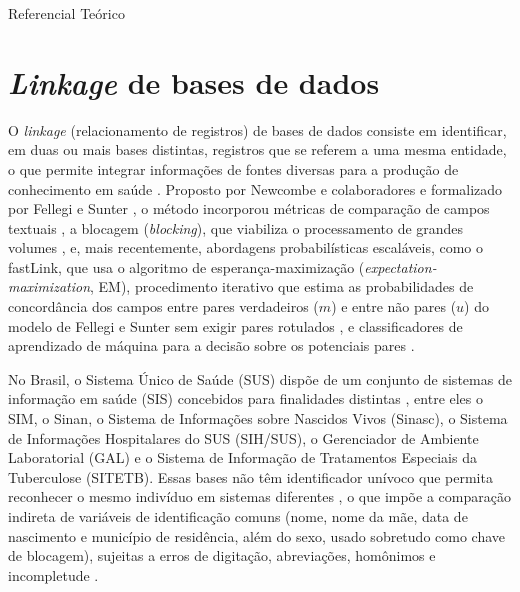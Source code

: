 \begin{chapter}{Referencial Teórico}\label{cap:referencial}

\section{\textit{Linkage} de bases de dados}\label{sec:linkage-conceitos}

O \textit{linkage} (relacionamento de registros) de bases de dados consiste em identificar, em duas ou mais bases distintas, registros que se referem a uma mesma entidade, o que permite integrar informações de fontes diversas para a produção de conhecimento em saúde \cite{Christen2012book}. Proposto por Newcombe e colaboradores \citeyearpar{Newcombe1959automatic} e formalizado por Fellegi e Sunter \citeyearpar{Fellegi1969theory}, o método incorporou métricas de comparação de campos textuais \cite{Jaro1989advances, Winkler1990string}, a blocagem (\textit{blocking}), que viabiliza o processamento de grandes volumes \cite{Coeli2002blocking}, e, mais recentemente, abordagens probabilísticas escaláveis, como o fastLink, que usa o algoritmo de esperança-maximização (\textit{expectation-maximization}, EM), procedimento iterativo que estima as probabilidades de concordância dos campos entre pares verdadeiros ($m$) e entre não pares ($u$) do modelo de Fellegi e Sunter sem exigir pares rotulados \cite{Enamorado2019fastlink}, e classificadores de aprendizado de máquina para a decisão sobre os potenciais pares \cite{Christen2012book}.

No Brasil, o Sistema Único de Saúde (SUS) dispõe de um conjunto de sistemas de informação em saúde (SIS) concebidos para finalidades distintas \cite{Paim2011brazilian}, entre eles o SIM, o Sinan, o Sistema de Informações sobre Nascidos Vivos (Sinasc), o Sistema de Informações Hospitalares do SUS (SIH/SUS), o Gerenciador de Ambiente Laboratorial (GAL) e o Sistema de Informação de Tratamentos Especiais da Tuberculose (SITETB). Essas bases não têm identificador unívoco que permita reconhecer o mesmo indivíduo em sistemas diferentes \cite{Camargo2000reclink}, o que impõe a comparação indireta de variáveis de identificação comuns (nome, nome da mãe, data de nascimento e município de residência, além do sexo, usado sobretudo como chave de blocagem), sujeitas a erros de digitação, abreviações, homônimos e incompletude \cite{Christen2012book, silva2012linkage}.


\end{chapter}
